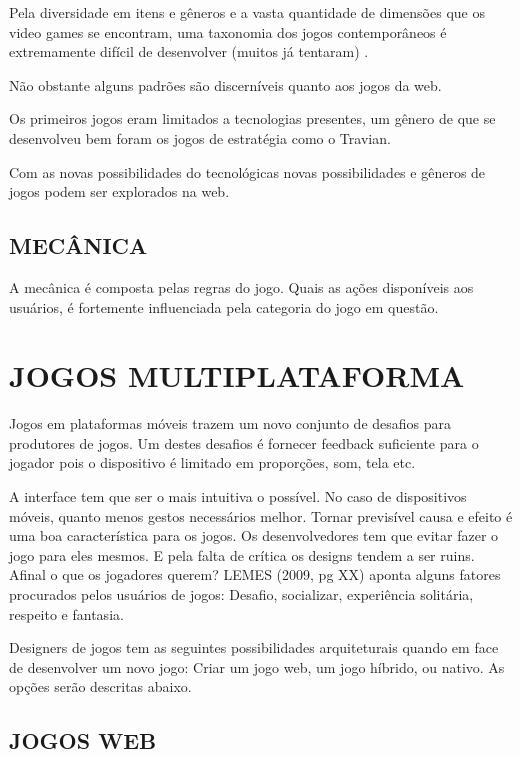 \documentclass[
12pt,
a4paper,
portuges,
draft
]{report}
\renewenvironment{quote}
               {\list{}{\rightmargin\leftmargin}%
                \item\relax\fontsize{10}{12}}
               {\endlist}
\begin{document}
\begin{quote}
Pela diversidade  em itens e gêneros e a vasta quantidade de dimensões que os video games se encontram, uma taxonomia dos jogos contemporâneos é extremamente difícil de desenvolver (muitos já tentaram) .
\end{quote}


Não obstante alguns padrões são discerníveis quanto aos jogos da web.


Os primeiros jogos eram limitados a tecnologias presentes, um gênero de que se desenvolveu bem foram os jogos
de estratégia como o Travian.

Com as novas possibilidades do tecnológicas novas possibilidades e gêneros de jogos podem ser explorados na web.

\subsection{MECÂNICA}

A mecânica é composta pelas regras do jogo. Quais as ações
disponíveis aos usuários, é fortemente influenciada pela categoria do
jogo em questão.

\section{JOGOS MULTIPLATAFORMA}

Jogos em plataformas móveis trazem um novo conjunto de desafios para
produtores de jogos. Um destes desafios é fornecer feedback suficiente
para o jogador pois o dispositivo é limitado em proporções, som, tela
etc.

A interface tem que ser o mais intuitiva o possível. No caso de
dispositivos móveis, quanto menos gestos necessários melhor. Tornar
previsível causa e efeito é uma boa característica para os jogos.
Os desenvolvedores tem que evitar fazer o jogo para eles mesmos.
E pela falta de crítica os designs tendem a ser ruins. Afinal o
que os jogadores querem? LEMES (2009, pg XX) aponta alguns fatores procurados
pelos usuários de jogos: Desafio, socializar, experiência solitária,
respeito e fantasia.

Designers de jogos tem as seguintes possibilidades arquiteturais
quando em face de desenvolver um novo jogo: Criar um jogo web,
um jogo híbrido, ou nativo. As opções serão descritas abaixo.

\subsection{JOGOS WEB}
\end{document}

